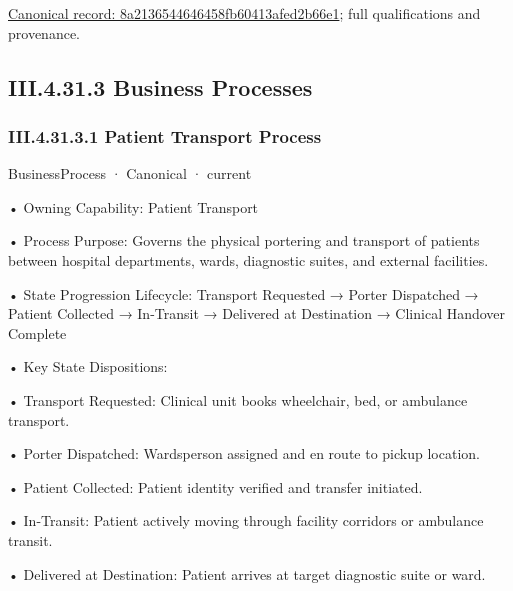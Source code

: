 {\footnotesize \href{../../../../continuum/business/business-function/8a2136544646458fb60413afed2b66e1.md}{Canonical record: 8a2136544646458fb60413afed2b66e1}; full qualifications and provenance.}\par
\subsection*{III.4.31.3 Business Processes}
\label{navigation:III.4.31.3}

\subsubsection*{III.4.31.3.1 Patient Transport Process}
\label{navigation:III.4.31.3.1}

\label{element:f2e58fd18cd94b0faaa364d3890a7c9e}
{\small BusinessProcess · Canonical · current}\par

•
Owning Capability: Patient Transport



•
Process Purpose: Governs the physical portering and transport of patients between hospital departments, wards, diagnostic suites, and external facilities.



•
State Progression Lifecycle: Transport Requested → Porter Dispatched → Patient Collected → In-Transit → Delivered at Destination → Clinical Handover Complete



•
Key State Dispositions:



•
Transport Requested: Clinical unit books wheelchair, bed, or ambulance transport.



•
Porter Dispatched: Wardsperson assigned and en route to pickup location.



•
Patient Collected: Patient identity verified and transfer initiated.



•
In-Transit: Patient actively moving through facility corridors or ambulance transit.



•
Delivered at Destination: Patient arrives at target diagnostic suite or ward.



